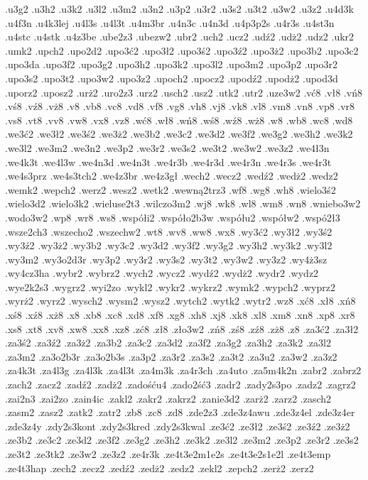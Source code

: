 {.u3g2
.u3h2
.u3k2
.u3l2
.u3m2
.u3n2
.u3p2
.u3r2
.u3s2
.u3t2
.u3w2
.u3z2
.u4d3k
.u4f3n
.u4k3lej
.u4l3s
.u4l3t
.u4m3br
.u4n3c
.u4n3d
.u4p3p2s
.u4r3s
.u4st3n
.u4stc
.u4stk
.u4z3be
.ube2z3
.ubezw2
.ubr2
.uch2
.ucz2
.udź2
.udż2
.udz2
.ukr2
.umk2
.upch2
.upo2d2
.upo3ć2
.upo3ł2
.upo3ś2
.upo3ź2
.upo3ż2
.upo3b2
.upo3c2
.upo3da
.upo3f2
.upo3g2
.upo3h2
.upo3k2
.upo3l2
.upo3m2
.upo3p2
.upo3r2
.upo3s2
.upo3t2
.upo3w2
.upo3z2
.upoch2
.upocz2
.upodź2
.upodż2
.upod3d
.uporz2
.uposz2
.urż2
.uro2z3
.urz2
.usch2
.usz2
.utk2
.utr2
.uze3w2
.vć8
.vł8
.vń8
.vś8
.vź8
.vż8
.v8
.vb8
.vc8
.vd8
.vf8
.vg8
.vh8
.vj8
.vk8
.vl8
.vm8
.vn8
.vp8
.vr8
.vs8
.vt8
.vv8
.vw8
.vx8
.vz8
.wć8
.wł8
.wń8
.wś8
.wź8
.wż8
.w8
.wb8
.wc8
.wd8
.we3ć2
.we3ł2
.we3ś2
.we3ż2
.we3b2
.we3c2
.we3d2
.we3f2
.we3g2
.we3h2
.we3k2
.we3l2
.we3m2
.we3n2
.we3p2
.we3r2
.we3s2
.we3t2
.we3w2
.we3z2
.we4ł3n
.we4k3t
.we4l3w
.we4n3d
.we4n3t
.we4r3b
.we4r3d
.we4r3n
.we4r3s
.we4r3t
.we4s3prz
.we4s3tch2
.we4z3br
.we4z3gł
.wech2
.wecz2
.wedź2
.wedż2
.wedz2
.wemk2
.wepch2
.werz2
.wesz2
.wetk2
.wewną2trz3
.wf8
.wg8
.wh8
.wielo3ś2
.wielo3d2
.wielo3k2
.wieluse2t3
.wilczo3m2
.wj8
.wk8
.wl8
.wm8
.wn8
.wniebo3w2
.wodo3w2
.wp8
.wr8
.ws8
.współi2
.współo2b3w
.współu2
.współw2
.wspó2ł3
.wsze2ch3
.wszecho2
.wszechw2
.wt8
.wv8
.ww8
.wx8
.wy3ć2
.wy3ł2
.wy3ś2
.wy3ź2
.wy3ż2
.wy3b2
.wy3c2
.wy3d2
.wy3f2
.wy3g2
.wy3h2
.wy3k2
.wy3l2
.wy3m2
.wy3o2d3r
.wy3p2
.wy3r2
.wy3s2
.wy3t2
.wy3w2
.wy3z2
.wy4ż3sz
.wy4cz3ha
.wybr2
.wybrz2
.wych2
.wycz2
.wydź2
.wydż2
.wydr2
.wydz2
.wye2k2s3
.wygrz2
.wyi2zo
.wykl2
.wykr2
.wykrz2
.wymk2
.wypch2
.wyprz2
.wyrż2
.wyrz2
.wysch2
.wysm2
.wysz2
.wytch2
.wytk2
.wytr2
.wz8
.xć8
.xł8
.xń8
.xś8
.xź8
.xż8
.x8
.xb8
.xc8
.xd8
.xf8
.xg8
.xh8
.xj8
.xk8
.xl8
.xm8
.xn8
.xp8
.xr8
.xs8
.xt8
.xv8
.xw8
.xx8
.xz8
.zć8
.zł8
.zło3w2
.zń8
.zś8
.zź8
.zż8
.z8
.za3ć2
.za3ł2
.za3ś2
.za3ź2
.za3ż2
.za3b2
.za3c2
.za3d2
.za3f2
.za3g2
.za3h2
.za3k2
.za3l2
.za3m2
.za3o2b3r
.za3o2b3s
.za3p2
.za3r2
.za3s2
.za3t2
.za3u2
.za3w2
.za3z2
.za4k3t
.za4l3g
.za4l3k
.za4l3t
.za4m3k
.za4r3ch
.za4uto
.za5m4k2n
.zabr2
.zabrz2
.zach2
.zacz2
.zadź2
.zadż2
.zadośću4
.zado2ść3
.zadr2
.zady2s3po
.zadz2
.zagrz2
.zai2n3
.zai2zo
.zain4ic
.zakl2
.zakr2
.zakrz2
.zanie3d2
.zarż2
.zarz2
.zasch2
.zasm2
.zasz2
.zatk2
.zatr2
.zb8
.zc8
.zd8
.zde2z3
.zde3z4awu
.zde3z4el
.zde3z4er
.zde3z4y
.zdy2s3kont
.zdy2s3kred
.zdy2s3kwal
.ze3ć2
.ze3ł2
.ze3ś2
.ze3ź2
.ze3ż2
.ze3b2
.ze3c2
.ze3d2
.ze3f2
.ze3g2
.ze3h2
.ze3k2
.ze3l2
.ze3m2
.ze3p2
.ze3r2
.ze3s2
.ze3t2
.ze3tk2
.ze3w2
.ze3z2
.ze4r3k
.ze4t3e2m1e2s
.ze4t3e2s1e2l
.ze4t3emp
.ze4t3hap
.zech2
.zecz2
.zedź2
.zedż2
.zedz2
.zekl2
.zepch2
.zerż2
.zerz2
}
